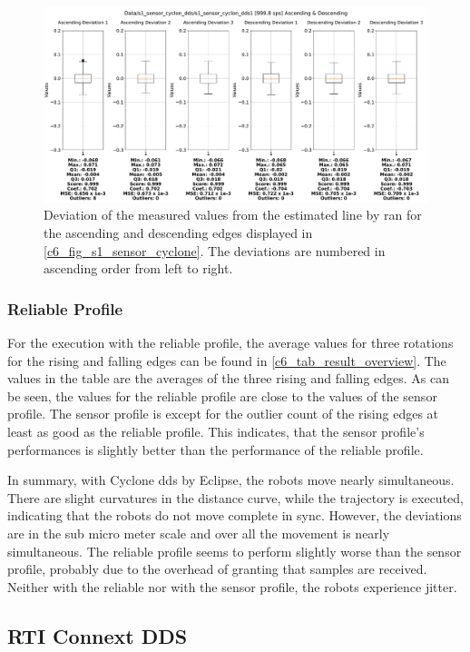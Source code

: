 \begin{figure}[htbp]
	\centering
	\includegraphics[width=1\textwidth]{Figures/c6/s1/s1_sensor_cyclone_dds_1_box_aio.pdf}
	\caption{Deviation of the measured values from the estimated line by \gls{ran} for the ascending and descending edges displayed in \autoref{c6_fig_s1_sensor_cyclone}. The deviations are numbered in ascending order from left to right.}
	\label{c6_fig_s1_sensor_cyclone_box_aio}
\end{figure}
\subsubsection{Reliable Profile}
For the execution with the reliable profile, the average values for three rotations for the rising and falling edges can be found in \autoref{c6_tab_result_overview}. The values in the table are the averages of the three rising and falling edges. As can be seen, the values for the reliable profile are close to the values of the sensor profile. The sensor profile is except for the outlier count of the rising edges at least as good as the reliable profile. This indicates, that the sensor profile's performances is slightly better than the performance of the reliable profile.


In summary, with Cyclone \gls{dds} by Eclipse, the robots move nearly simultaneous. There are slight curvatures in the distance curve, while the trajectory is executed, indicating that the robots do not move complete in sync. However, the deviations are in the sub micro meter scale and over all the movement is nearly simultaneous. The reliable profile seems to perform slightly worse than the sensor profile, probably due to the overhead of granting that samples are received. Neither with the reliable nor with the sensor profile, the robots experience jitter.
\subsection{RTI Connext DDS}
